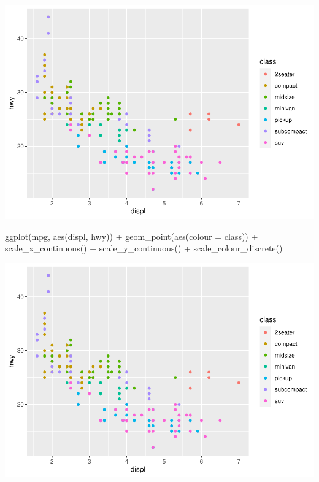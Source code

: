 \documentclass[
]{article}
\newenvironment{Shaded}{\begin{snugshade}}{\end{snugshade}}
\newcommand{\AttributeTok}[1]{\textcolor[rgb]{0.77,0.63,0.00}{#1}}
\newcommand{\FunctionTok}[1]{\textcolor[rgb]{0.00,0.00,0.00}{#1}}
\newcommand{\NormalTok}[1]{#1}
\newcommand{\SpecialCharTok}[1]{\textcolor[rgb]{0.00,0.00,0.00}{#1}}
\begin{document}
\includegraphics{Journal_files/figure-latex/unnamed-chunk-54-1.pdf}

\begin{Shaded}
\begin{Highlighting}[]
\FunctionTok{ggplot}\NormalTok{(mpg, }\FunctionTok{aes}\NormalTok{(displ, hwy)) }\SpecialCharTok{+}
  \FunctionTok{geom\_point}\NormalTok{(}\FunctionTok{aes}\NormalTok{(}\AttributeTok{colour =}\NormalTok{ class)) }\SpecialCharTok{+}
  \FunctionTok{scale\_x\_continuous}\NormalTok{() }\SpecialCharTok{+}
  \FunctionTok{scale\_y\_continuous}\NormalTok{() }\SpecialCharTok{+}
  \FunctionTok{scale\_colour\_discrete}\NormalTok{()}
\end{Highlighting}
\end{Shaded}

\includegraphics{Journal_files/figure-latex/unnamed-chunk-54-2.pdf}
\end{document}
